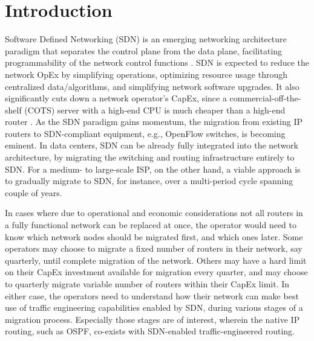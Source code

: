 \documentclass[conference]{IEEEtran}
\begin{document}
\section{Introduction}\label{sec:intro}
Software Defined Networking (SDN) is an emerging networking architecture
paradigm that separates the control plane from the data plane, facilitating
programmability of the network control functions \cite{SDN-onf-whitepaper}. SDN
is expected to reduce the network OpEx by simplifying operations, optimizing
resource usage through centralized data/algorithms, and simplifying network
software upgrades. It also significantly cuts down a network operator's CapEx,
since a commercial-off-the-shelf (COTS) server with a high-end CPU is much
cheaper than a high-end router \cite{metaswitch-whitepaper}.
As the SDN paradigm gains momentum, the migration from existing IP routers to
SDN-compliant equipment, e.g., OpenFlow switches, is becoming eminent. In data
centers, SDN can be already fully integrated into the network architecture, by
migrating the switching and routing infrastructure entirely to SDN. For a
medium- to large-scale ISP, on the other hand, a viable approach is to gradually
migrate to SDN, for instance, over a multi-period cycle spanning couple of
years.

\par In cases where due to operational and economic considerations not all
routers in a fully functional network can be replaced at once, the operator
would need to know which network nodes should be migrated first, and which ones
later. Some operators may choose to migrate a fixed number of routers in their
network, say quarterly, until complete migration of the network. Others may have
a hard limit on their CapEx investment available for migration every quarter,
and may choose to quarterly migrate variable number of routers within their
CapEx limit.
In either case, the operators need to understand how their network can make best
use of traffic engineering capabilities enabled by SDN, during various stages of
a migration process. Especially those stages are of interest, wherein the native
IP routing, such as OSPF, co-exists with SDN-enabled traffic-engineered routing.
\end{document}
